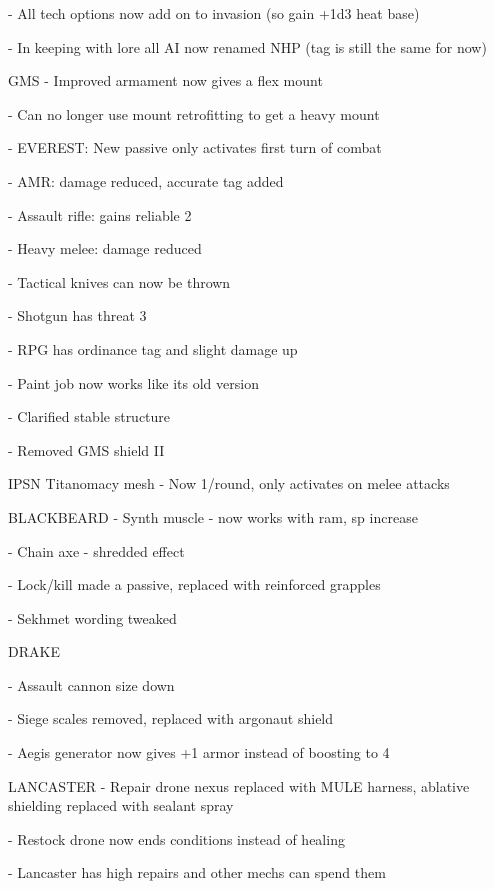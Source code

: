     -    All tech options now add on to invasion (so gain +1d3 heat base)


    -    In keeping with lore all AI now renamed NHP (tag is still the same for now)


GMS
    -    Improved armament now gives a flex mount

    -    Can no longer use mount retrofitting to get a heavy mount

    -    EVEREST: New passive only activates first turn of combat


    -    AMR: damage reduced, accurate tag added

    -    Assault rifle: gains reliable 2

    -    Heavy melee: damage reduced


    -    Tactical knives can now be thrown

    -    Shotgun has threat 3

    -    RPG has ordinance tag and slight damage up


    -    Paint job now works like its old version

    -    Clarified stable structure

    -    Removed GMS shield II





                                                        IPSN
Titanomacy mesh - Now 1/round, only activates on melee attacks


BLACKBEARD
    -    Synth muscle - now works with ram, sp increase

    -    Chain axe - shredded effect

    -    Lock/kill made a passive, replaced with reinforced grapples


    -    Sekhmet wording tweaked

DRAKE

    -    Assault cannon size down


    -    Siege scales removed, replaced with argonaut shield

    -    Aegis generator now gives +1 armor instead of boosting to 4


LANCASTER
    -    Repair drone nexus replaced with MULE harness, ablative shielding replaced with sealant spray

    -    Restock drone now ends conditions instead of healing

    -    Lancaster has high repairs and other mechs can spend them


